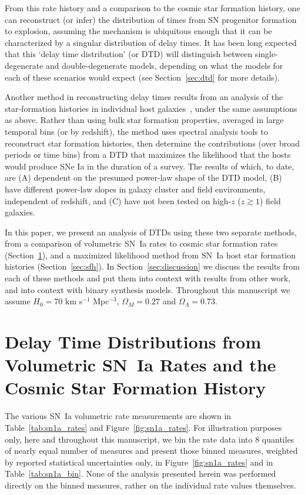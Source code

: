\documentclass[apj, linenumbers]{aastex62}
\begin{document}
From this rate history and a comparison to the cosmic star formation history, one can reconstruct (or infer) the distribution of times from SN progenitor formation to explosion, assuming the mechanism is ubiquitous enough that it can be characterized by a singular distribution of delay times. It has been long expected that this `delay time distribution' (or DTD) will distinguish between single-degenerate \citep{Whelan:1973,Nomoto:1982vh} and double-degenerate \citep{Iben:1984, Webbink:1984} models, depending on what the models for each of these scenarios would expect (see Section~\ref{sec:dtd} for more details).

Another method in reconstructing delay times results from an analysis of the star-formation histories in individual host galaxies~\citep{Brandt:2010, Maoz:2011, Maoz:2012a}, under the same assumptions as above. Rather than using bulk star formation properties, averaged in large temporal bins (or by redshift), the method uses spectral analysis tools to reconstruct star formation histories, then determine the contributions (over broad periods or time bins) from a DTD that maximizes the likelihood that the hosts would produce SNe Ia in the duration of a survey. The results of which, to date, are (A) dependent on the presumed power-law shape of the DTD model, (B) have different power-law slopes in galaxy cluster and field environments, independent of redshift, and (C) have not been tested on high-$z$ ($z\gtrsim1$) field galaxies. 

In this paper, we present an analysis of DTDs using these two separate methods, from a comparison of volumetric SN~Ia rates to cosmic star formation rates (Section~\ref{sec:rates}), and a maximized likelihood method from SN~Ia host star formation histories (Section~\ref{sec:sfh}). In Section~\ref{sec:discussion} we discuss the results from each of these methods and put them into context with results from other work, and into context with binary synthesis models. Throughout this manuscript we assume $H_0=70$ km s$^{-1}$ Mpc$^{-3}$, $\Omega_M=0.27$ and $\Omega_\Lambda=0.73$. 

\section{Delay Time Distributions from Volumetric SN~Ia Rates and the Cosmic Star Formation History}\label{sec:rates}
The various SN~Ia volumetric rate measurements are shown in Table~\ref{tab:sn1a_rates} and Figure~\ref{fig:sn1a_rates}. For illustration purposes only, here and throughout this manuscript, we bin the rate data into 8 quantiles of nearly equal number of measures and present those binned measures, weighted by reported statistical uncertainties only, in Figure~\ref{fig:sn1a_rates} and in Table~\ref{tab:sn1a_bin}. None of the analysis presented herein was performed directly on the binned measures, rather on the individual rate values themselves.
\end{document}
